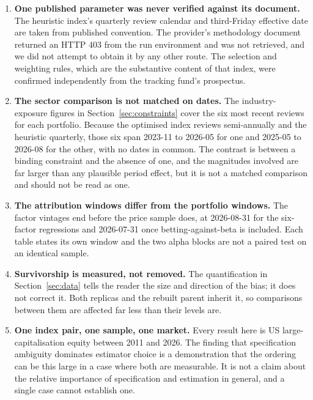 \begin{enumerate}[label=L\arabic*., leftmargin=*, itemsep=4pt]
\item \textbf{One published parameter was never verified against its document.} The
heuristic index's quarterly review calendar and third-Friday effective date are
taken from published convention. The provider's methodology document
\citep{spdji_lowvol_methodology} returned an HTTP 403 from the run environment
and was not retrieved, and we did not
attempt to obtain it by any other route. The selection and weighting rules,
which are the substantive content of that index, were confirmed independently
from the tracking fund's prospectus.

\item \textbf{The sector comparison is not matched on dates.} The industry-exposure
figures in Section~\ref{sec:constraints} cover the six most recent reviews for
each portfolio. Because the optimised index reviews semi-annually and the
heuristic quarterly, those six span 2023-11 to 2026-05 for one and 2025-05 to
2026-08 for the other, with no dates in common. The contrast is between a
binding constraint and the absence of one, and the magnitudes involved are far
larger than any plausible period effect, but it is not a matched comparison and
should not be read as one.

\item \textbf{The attribution windows differ from the portfolio windows.} The factor
vintages end before the price sample does, at 2026-08-31 for the six-factor
regressions and 2026-07-31 once betting-against-beta is included. Each table
states its own window and the two alpha blocks are not a paired test on an
identical sample.

\item \textbf{Survivorship is measured, not removed.} The quantification in
Section~\ref{sec:data} tells the reader the size and direction of the bias; it
does not correct it. Both replicas and the rebuilt parent inherit it, so
comparisons between them are affected far less than their levels are.

\item \textbf{One index pair, one sample, one market.} Every result here is US
large-capitalisation equity between 2011 and 2026. The finding that
specification ambiguity dominates estimator choice is a demonstration that the
ordering can be this large in a case where both are measurable. It is not a
claim about the relative importance of specification and estimation in
general, and a single case cannot establish one.
\end{enumerate}
